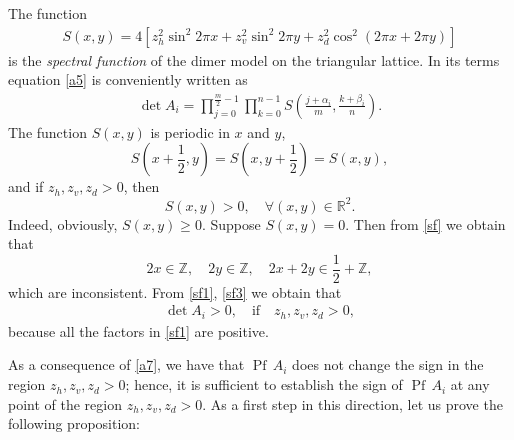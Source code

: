 \documentclass[12pt,reqno]{amsart}
\numberwithin{equation}{section}
\newcommand{\R}{{\mathbb R}}
\newcommand{\Z}{{\mathbb Z}}
\newcommand{\al}{\alpha}
\newcommand{\be}{\beta}
\newcommand{\Pf}{{\operatorname{Pf}\,}}
\begin{document}
The function 
\begin{equation}\label{sf}
\begin{aligned}
S(x,y)=4\left[ z_h^2\sin^2 2\pi x+z_v^2\sin^2 2\pi y
+z_d^2\cos^2\left(2\pi x+2\pi y\right)\right]
\end{aligned}
\end{equation}
is the {\it spectral function} of the dimer model on the triangular lattice.
In its terms equation \eqref{a5} is conveniently written as
\begin{equation}\label{sf1}
\begin{aligned}
\det A_i=\prod_{j=0}^{\frac{m}{2}-1}\prod_{k=0}^{n-1} S\left( \frac{j+\al_i}{m},
\frac{k+\be_i}{n}\right).
\end{aligned}
\end{equation}
The function $S(x,y)$ is periodic in $x$ and $y$,
\begin{equation}\label{sf2}
S\left(x+\frac{1}{2},y\right)=S\left(x,y+\frac{1}{2}\right)=S(x,y),
\end{equation}
and if $z_h,z_v,z_d>0$, then 
\begin{equation}\label{sf3}
S(x,y)>0,\quad \forall (x,y)\in \R^2.
\end{equation}
Indeed, obviously, $S(x,y)\ge 0$.
Suppose $S(x,y)=0$. Then from \eqref{sf} we obtain that
\begin{equation}\label{sf4}
2x\in\Z, \quad 2y\in \Z, \quad 2x+2y\in\frac{1}{2}+ \Z,  
\end{equation}
which are inconsistent. 
From \eqref{sf1}, \eqref{sf3} we obtain that
\begin{equation}\label{a7}
\begin{aligned}
\det A_i>0,\quad \textrm{if}\quad z_h,z_v,z_d>0,
\end{aligned}
\end{equation}
because all the factors in \eqref{sf1} are positive.

As a consequence of \eqref{a7}, we have that $\Pf A_i$ does not change the sign in the region
$z_h,z_v,z_d>0$; hence, it is sufficient to establish the sign of $\Pf A_i$ at any point of the region $z_h,z_v,z_d>0$. As a first step in this direction,
let us prove the following
proposition:
\end{document}
